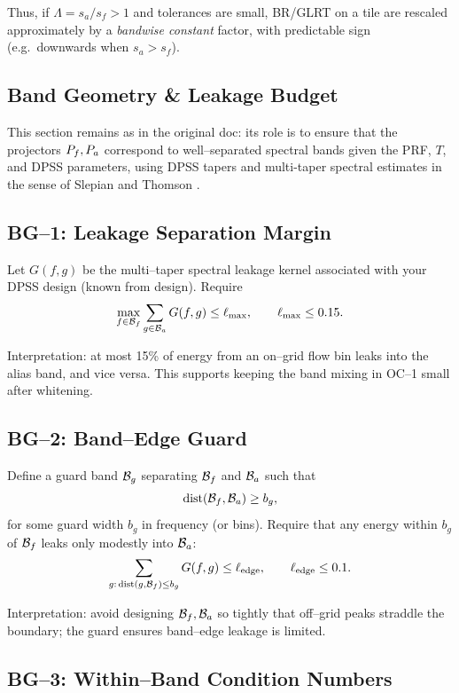 Thus, if $\Lambda = s_a/s_f>1$ and tolerances are small, BR/GLRT on a tile are rescaled approximately by a \emph{bandwise constant} factor, with predictable sign (e.g.\ downwards when $s_a>s_f$).

\subsection{Band Geometry \& Leakage Budget}
\label{app:ka-band-geometry}

This section remains as in the original doc: its role is to ensure that the projectors $P_f,P_a$ correspond to well--separated spectral bands given the PRF, $T$, and DPSS parameters, using DPSS tapers and multi-taper spectral estimates in the sense of Slepian and Thomson \cite{SlepianDPSS1978,ThomsonMTM1982,PercivalWaldenSAPABook1993}.

\subsection{BG--1: Leakage Separation Margin}

Let $G(f,g)$ be the multi--taper spectral leakage kernel associated with your DPSS design (known from design). Require
\[
\max_{f\in\mathcal{B}_f} \sum_{g\in\mathcal{B}_a} G(f,g) \le \ell_{\max},\qquad \ell_{\max} \le 0.15.
\]

Interpretation: at most 15\% of energy from an on--grid flow bin leaks into the alias band, and vice versa. This supports keeping the band mixing in OC--1 small after whitening.

\subsection{BG--2: Band--Edge Guard}

Define a guard band $\mathcal{B}_g$ separating $\mathcal{B}_f$ and $\mathcal{B}_a$ such that
\[
\mathrm{dist}(\mathcal{B}_f,\mathcal{B}_a) \ge b_g,
\]
for some guard width $b_g$ in frequency (or bins). Require that any energy within $b_g$ of $\mathcal{B}_f$ leaks only modestly into $\mathcal{B}_a$:
\[
\sum_{g:\,\mathrm{dist}(g,\mathcal{B}_f)\le b_g} G(f,g) \le \ell_{\text{edge}},\qquad \ell_{\text{edge}}\le 0.1.
\]

Interpretation: avoid designing $\mathcal{B}_f,\mathcal{B}_a$ so tightly that off--grid peaks straddle the boundary; the guard ensures band--edge leakage is limited.

\subsection{BG--3: Within--Band Condition Numbers}

